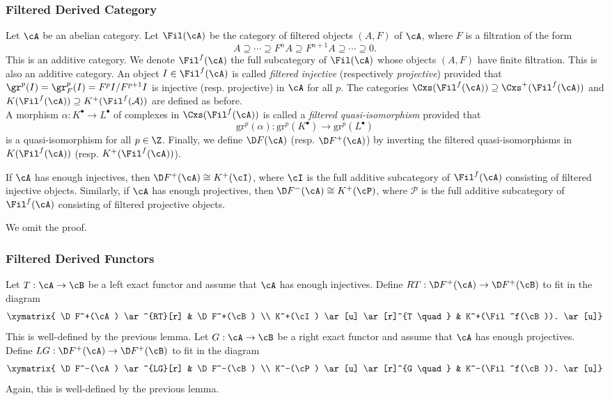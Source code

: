 \subsubsection{Filtered Derived Category}

\begin{defi}
Let $\cA$ be an abelian category. Let $\Fil(\cA)$ be the category of filtered objects $(A,F)$ of $\cA$, where $F$ is a filtration of the form
$$
A \supseteq \cdots \supseteq F^n A \supseteq F^{n+1}A \supseteq \cdots \supseteq 0.
$$
This is an additive category. We denote $\Fil^f(\cA)$ the full subcategory of $\Fil(\cA)$ whose objects $(A,F)$ have finite filtration.  This is also an additive category. An object $I \in \Fil^f(\cA)$ is called \emph{filtered injective} (respectively \emph{projective}) provided that $\gr^p(I) = \gr_F^p(I) = F^pI/F^{p+1}I$ is injective (resp. projective) in $\cA$ for all $p$. The categories $\Cxs(\Fil^f(\cA)) \supseteq \Cxs^+(\Fil^f(\cA))$ and $K(\Fil^f(\cA)) \supseteq K^+(\Fil^f(\mathcal A))$ are defined as before.
\\
A morphism $\alpha : K^\bullet \to L^\bullet$ of complexes in $\Cxs(\Fil^f(\cA))$ is called a \emph{filtered quasi-isomorphism} provided that 
$$
\mathrm{gr}^p(\alpha): \mathrm{gr}^p(K^\bullet) \to \mathrm{gr}^p(L^\bullet)
$$ 
is a quasi-isomorphism for all $p \in \Z$. Finally, we define $\D F(\cA)$ (resp. $\D F^+(\cA)$) by inverting the filtered quasi-isomorphisms in $K(\Fil^f(\cA))$ (resp. $K^+(\Fil^f(\cA))$). 
\end{defi}

\begin{lem}
If $\cA$ has enough injectives, then $\D F^+(\cA) \cong K^+(\cI)$, where $\cI$ is the full additive subcategory of $\Fil^f(\cA)$ consisting of filtered injective objects. Similarly, if $\cA$ has enough projectives, then $\D F^-(\cA) \cong K^+(\cP)$, where $\mathcal P$ is the full additive subcategory of $\Fil^f(\cA)$ consisting of filtered projective objects.
\end{lem}

We omit the proof.

\subsubsection{Filtered Derived Functors}

\begin{defi}
Let $T: \cA \to \cB$ be a left exact functor and assume that $\cA$ has enough injectives.  Define $RT: \D F^+(\cA) \to \D F^+(\cB)$ to fit in the diagram
$$
\xymatrix{ 
\D F^+(\cA) \ar^{RT}[r] & \D F^+(\cB) \\
K^+(\cI) \ar[u] \ar[r]^{T \quad} & K^+(\Fil^f(\cB)). \ar[u]}
$$
This is well-defined by the previous lemma. Let $G: \cA \to \cB$ be a right exact functor  and assume that $\cA$ has enough projectives.  Define $LG: \D F^+(\cA) \to \D F^+(\cB)$ to fit in the diagram
$$
\xymatrix{ 
\D F^-(\cA) \ar^{LG}[r] & \D F^-(\cB) \\
K^-(\cP) \ar[u] \ar[r]^{G \quad} & K^-(\Fil^f(\cB)). \ar[u]}
$$
Again, this is well-defined by the previous lemma.
\end{defi}

